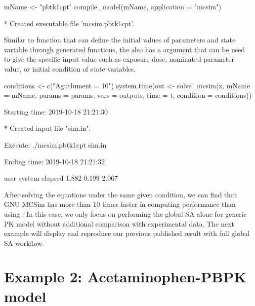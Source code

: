 \begin{Schunk}
\begin{Sinput}
mName <- "pbtk1cpt"
compile_model(mName, application = "mcsim")
\end{Sinput}
\begin{Soutput}
  * Created executable file 'mcsim.pbtk1cpt'.
\end{Soutput}
\end{Schunk}

Similar to  function that can define the initial values
of parameters and state variable through generated functions, the
 also has a  argument that can be
used to give the specific input value such as exposure dose, nominated
parameter value, or initial condition of state variables.

\begin{Schunk}
\begin{Sinput}
conditions <- c("Agutlument = 10") 
system.time(out <- solve_mcsim(x, mName = mName, params = params, 
                               vars = outputs, time = t, 
                               condition = conditions))
\end{Sinput}
\begin{Soutput}
  Starting time: 2019-10-18 21:21:30
\end{Soutput}
\begin{Soutput}
  * Created input file "sim.in".
\end{Soutput}
\begin{Soutput}
  Execute: ./mcsim.pbtk1cpt sim.in
\end{Soutput}
\begin{Soutput}
  Ending time: 2019-10-18 21:21:32
\end{Soutput}
\begin{Soutput}
     user  system elapsed 
    1.882   0.199   2.067
\end{Soutput}
\end{Schunk}

After solving the equations under the same given condition, we can find
that GNU MCSim has more than 10 times faster in computing performance
than using . In this case, we only focus on performing
the global SA alone for generic PK model without additional comparison
with experimental data. The next example will display and reproduce our
previous published result \citep{fphar201800588} with full global SA
workflow.

\hypertarget{example-2-acetaminophen-pbpk-model}{%
\section{Example 2: Acetaminophen-PBPK
model}\label{example-2-acetaminophen-pbpk-model}}

